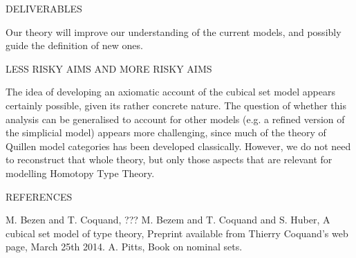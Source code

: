 DELIVERABLES

Our theory will improve our understanding of the current models, and possibly guide the definition of new ones.

LESS RISKY AIMS AND MORE RISKY AIMS

The idea of developing an axiomatic account of the cubical set model appears certainly possible, given its rather concrete nature. The question of whether this analysis can be generalised to account for other models (e.g. a refined version of the simplicial model) appears more challenging, since much of the theory of Quillen model categories has been developed classically. However, we do not need to reconstruct that whole theory, but only those aspects that are relevant for modelling Homotopy Type Theory.


REFERENCES

M. Bezen and T. Coquand, ???
M. Bezem and T. Coquand and S. Huber, A cubical set model of type theory, Preprint available from Thierry Coquand's web page, March 25th 2014.
A. Pitts, Book on nominal sets.